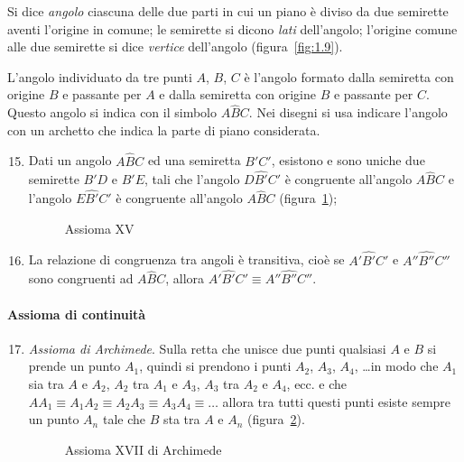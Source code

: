 \begin{center}
 
\end{center}

\begin{definizione}
Si dice \emph{angolo} ciascuna delle due parti in cui un piano è diviso da due semirette aventi l'origine in comune; le semirette si dicono \emph{lati} dell'angolo; l'origine comune alle due semirette si dice \emph{vertice} dell'angolo (figura~\ref{fig:1.9}).
\end{definizione}
\begin{figure*}[b,t,h]
\centering  
\caption{Le semirette $r$ e $s$, aventi l'origine $V$ comune, individuano due regioni del piano ognuna delle quali è detta angolo.}\label{fig:1.9}
\end{figure*}

L'angolo individuato da tre punti $A$, $B$, $C$ è l'angolo formato dalla semiretta con origine $B$ e passante per $A$ e dalla semiretta con origine $B$ e passante per $C$. Questo angolo si indica con il simbolo $A\widehat{B}C$. Nei disegni si usa indicare l'angolo con un archetto che indica la parte di piano considerata.

\begin{enumerate}[label=\Roman{*}.]
\setcounter{enumi}{14}
\item Dati un angolo $A\widehat{B}C$ ed una semiretta $B'C'$, esistono e sono uniche due semirette $B'D$ e $B'E$, tali che l'angolo $D\widehat{B'}C'$ è congruente all'angolo $A\widehat{B}C$ e l'angolo $E\widehat{B'}C'$ è congruente all'angolo $A\widehat{B}C$ (figura~\ref{fig:1.10});
\begin{figure}[b,t,h]
 \centering 
 \caption{Assioma XV}\label{fig:1.10}
\end{figure}
\item La relazione di congruenza tra angoli è transitiva, cioè se  $A'\widehat{B'}C'$ e  $A''\widehat{B''}C''$ sono congruenti ad $A\widehat{B}C$, allora  $A'\widehat{B'}C' \equiv A''\widehat{B''}C''$.
\end{enumerate}

\paragraph{Assioma di continuità}

\begin{enumerate}[label=\Roman{*}.]
\setcounter{enumi}{16}
\item \emph{Assioma di Archimede}. Sulla retta che unisce due punti qualsiasi $A$ e $B$ si prende un punto $A_1$, quindi si prendono i punti $A_2$, $A_3$, $A_4$, \ldots in modo che $A_1$ sia tra $A$ e $A_2$, $A_2$ tra $A_1$ e $A_3$, $A_3$ tra $A_2$ e $A_4$, ecc. e che  $AA_1\equiv A_1A_2\equiv A_2A_3\equiv A_3A_4\equiv\ldots$ allora tra tutti questi punti esiste sempre un punto $A_n$ tale che $B$ sta tra $A$ e $A_n$ (figura~\ref{fig:1.11}).
\begin{figure}[b,t,h]
 \centering 
 \caption{Assioma XVII di Archimede}\label{fig:1.11}
\end{figure}
\end{enumerate}

